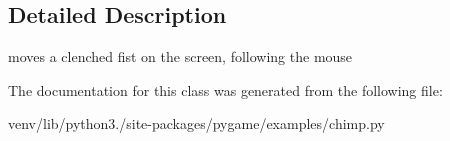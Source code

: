 \subsection{Detailed Description}
\begin{DoxyVerb}moves a clenched fist on the screen, following the mouse\end{DoxyVerb}
 

The documentation for this class was generated from the following file\+:\begin{DoxyCompactItemize}
\item 
venv/lib/python3./site-\/packages/pygame/examples/chimp.\+py\end{DoxyCompactItemize}
